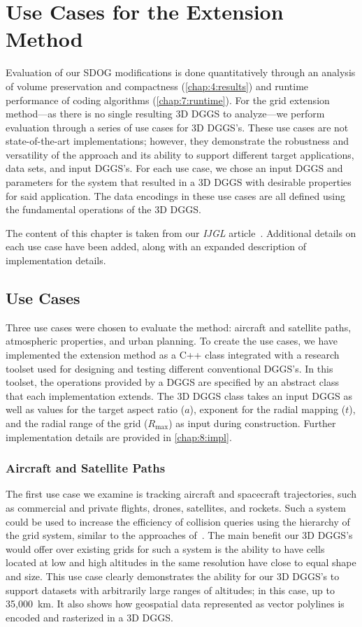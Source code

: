 \chapter{Use Cases for the Extension Method} \label{chap:usecases}
Evaluation of our SDOG modifications is done quantitatively through an analysis of volume preservation and compactness (\cref{chap:4:results}) and runtime performance of coding algorithms (\cref{chap:7:runtime}).
For the grid extension method---as there is no single resulting 3D DGGS to analyze---we perform evaluation through a series of use cases for 3D DGGS's.
These use cases are not state-of-the-art implementations; however, they demonstrate the robustness and versatility of the approach and its ability to support different target applications, data sets, and input DGGS's.
For each use case, we chose an input DGGS and parameters for the system that resulted in a 3D DGGS with desirable properties for said application.
The data encodings in these use cases are all defined using the fundamental operations of the 3D DGGS.


The content of this chapter is taken from our \textit{IJGL} article~\cite{ulmer2020general}.
Additional details on each use case have been added, along with an expanded description of implementation details.


\section{Use Cases}
Three use cases were chosen to evaluate the method: aircraft and satellite paths, atmospheric properties, and urban planning.
To create the use cases, we have implemented the extension method as a C++ class integrated with a research toolset used for designing and testing different conventional DGGS's.
In this toolset, the operations provided by a DGGS are specified by an abstract class that each implementation extends.
The 3D DGGS class takes an input DGGS as well as values for the target aspect ratio ($a$), exponent for the radial mapping ($t$), and the radial range of the grid ($R_\mathrm{max}$) as input during construction.
Further implementation details are provided in \cref{chap:8:impl}.


\subsection{Aircraft and Satellite Paths} \label{chap:8:sats}
The first use case we examine is tracking aircraft and spacecraft trajectories, such as commercial and private flights, drones, satellites, and rockets.
Such a system could be used to increase the efficiency of collision queries using the hierarchy of the grid system, similar to the approaches of~\cite{miao2019low, zhai2019collision}.
The main benefit our 3D DGGS's would offer over existing grids for such a system is the ability to have cells located at low and high altitudes in the same resolution have close to equal shape and size.
This use case clearly demonstrates the ability for our 3D DGGS's to support datasets with arbitrarily large ranges of altitudes; in this case, up to 35,000~km.
It also shows how geospatial data represented as vector polylines is encoded and rasterized in a 3D DGGS.


